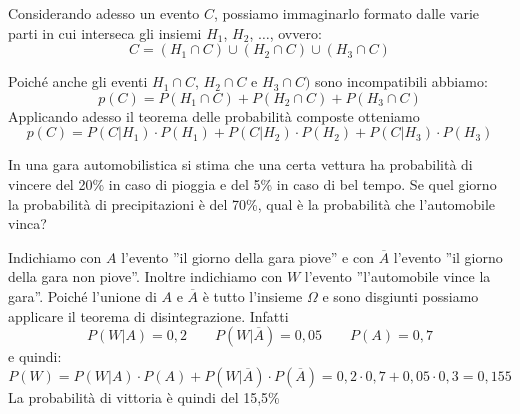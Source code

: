 Considerando adesso un evento $C$, possiamo immaginarlo formato dalle varie 
parti in cui interseca gli insiemi $H_1$, $H_2$, $\dots$, ovvero:
\[C = (H_1 \cap C) \cup (H_2 \cap C) \cup (H_3 \cap C)\]
\begin{inaccessibleblock}
 \begin{figure}[htpb]
\begin{minipage}[c]{.45\textwidth}
\end{minipage}\hfil
\begin{minipage}[c]{.45\textwidth}
\end{minipage}
\end{figure}
\end{inaccessibleblock}
Poiché anche gli eventi $H_1 \cap C$, $H_2 \cap C$ e $H_3 \cap C)$ sono 
incompatibili abbiamo:
\[p(C)=P(H_1 \cap C)+P(H_2 \cap C) + P(H_3 \cap C)\]
Applicando adesso il teorema delle probabilità composte otteniamo
\[p(C)=P(C|H_1)\cdot P(H_1)+P(C|H_2)\cdot P(H_2)+P(C|H_3)\cdot P(H_3)\]
\begin{esempio}
In una gara automobilistica si stima che una certa vettura ha probabilità di 
vincere del 20\% in caso di pioggia e del 5\% in caso di bel tempo. Se quel 
giorno la probabilità di precipitazioni è del 70\%, qual è la probabilità che 
l'automobile vinca?

Indichiamo con $A$ l'evento ''il giorno della gara piove'' 
e con $\overline A$ l'evento ''il giorno della gara non piove''. 
Inoltre indichiamo con $W$ l'evento ''l'automobile vince la gara''. 
Poiché l'unione di $A$ e $\overline A$ è tutto l'insieme $\Omega$ e sono 
disgiunti possiamo applicare il teorema di disintegrazione. Infatti
\[P(W|A)=0,2 \qquad P(W|\overline A)=0,05 \qquad P(A)=0,7\]
e quindi:
\[P(W)=P(W|A)\cdot P(A) + P(W|\overline A)\cdot P(\overline A)=0,2 \cdot 
0,7 + 0,05 \cdot 0,3 = 0,155\]
La probabilità di vittoria è quindi del 15,5\%
\end{esempio}

